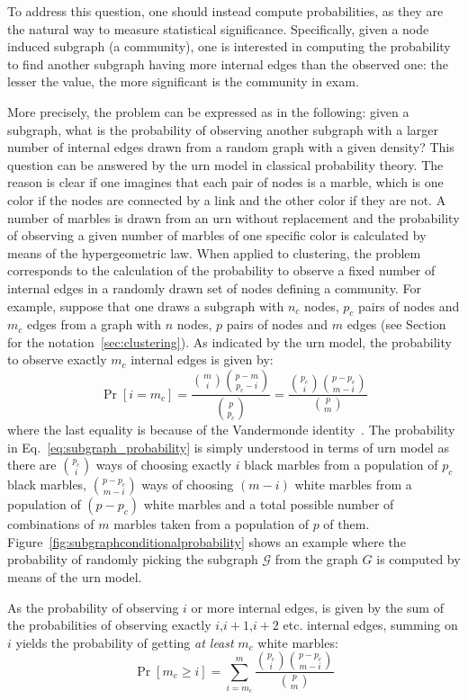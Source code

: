 To address this question, one should instead compute probabilities, as they are the natural way to measure statistical significance.
Specifically, given a node induced subgraph (a community), one is interested in computing the probability to find another subgraph having more internal edges than the observed one: the lesser the value, the more significant is the community in exam.

More precisely, the problem can be expressed as in the following: given a subgraph, what is the probability of observing another subgraph with a larger number of internal edges drawn from a random graph with a given density?
This question can be answered by the urn model in classical probability theory. The reason is clear if one imagines that each pair of nodes is a marble, which is one color if the nodes are connected by a link and the other color if they are not.
A number of marbles is drawn from an urn without replacement and the probability of observing a given number of marbles of one specific color is calculated by means of the hypergeometric law.
When applied to clustering, the problem corresponds to the calculation of the probability to observe a fixed number of internal edges in a randomly drawn set of nodes defining a community.
For example, suppose that one draws a subgraph with $n_c$ nodes, $p_c$ pairs of nodes and $m_c$ edges from a graph with $n$ nodes, $p$ pairs of nodes and $m$ edges (see Section for the notation~\ref{sec:clustering}).
As indicated by the urn model, the probability to observe exactly $m_c$ internal edges is given by:
\begin{equation}\label{eq:subgraph_probability}
\Pr[i=m_c] = \frac{\binom{m}{i}\binom{p-m}{p_c-i} }{\binom{p}{p_c}} = \frac{\binom{p_c}{i} \binom{p-p_c}{m-i}}{\binom{p}{m}}
\end{equation}
where the last equality is because of the Vandermonde identity~\cite{feller1968}.
The probability in Eq.~\ref{eq:subgraph_probability} is simply understood in terms of urn model as there are $\binom{p_c}{i}$ ways of choosing exactly $i$ black marbles from a population of $p_c$ black marbles, $\binom{p-p_c}{m-i}$ ways of choosing $(m-i)$ white marbles from a population of $(p-p_c)$ white marbles and a total possible number of combinations of $m$ marbles taken from a population of $p$ of them. Figure~\ref{fig:subgraphconditionalprobability} shows an example where the probability of randomly picking the subgraph $\mathcal{G}$ from the graph $G$ is computed by means of the urn model.

As the probability of observing $i$ or more internal edges, is given by the sum of the probabilities of observing exactly $i$,$i+1$,$i+2$ etc. internal edges, summing on $i$ yields the probability of getting \emph{at least} $m_c$ white marbles:
\begin{equation}\label{eq:subgraph_probability_marginalized}
\Pr[ m_c \geq i ] = \sum\limits_{i=m_c}^{m} \frac{\binom{p_c}{i} \binom{p-p_c}{m-i}}{\binom{p}{m}}
\end{equation}

